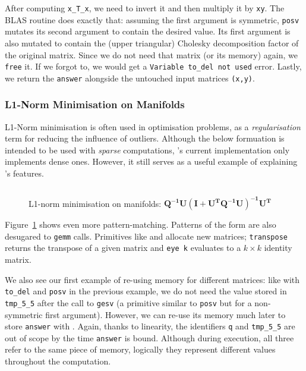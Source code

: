 After computing \texttt{x\_T\_x}, we need to invert it and then multiply it by
\texttt{xy}. The BLAS routine 
does exactly that: assuming the first argument is symmetric, \texttt{posv}
mutates its second argument to contain the desired value. Its first argument is
also mutated to contain the (upper triangular) Cholesky decomposition factor of
the original matrix. Since we do not need that matrix (or its memory) again, we
\texttt{free} it. If we forgot to, we would get a \texttt{Variable to\_del not
used} error. Lastly, we return the \texttt{answer} alongside the untouched
input matrices \texttt{(x,y)}.

\subsubsection{L1-Norm Minimisation on Manifolds}

L1-Norm minimisation is often used in optimisation problems, as a
\emph{regularisation} term for reducing the influence of outliers.  Although
the below formuation\cite{bronstein} is intended to be used with \emph{sparse}
computations, \lang's current implementation only implements dense ones.
However, it still serves as a useful example of explaining \lang's features.

\begin{figure}[t]
    \centering
    \inputminted[fontsize=\small]{ocaml}{../../examples/l1_norm_min.lt}
    \caption{L1-norm minimisation on manifolds:
        $\mathbf{Q^{-1}U(I+U^TQ^{-1}U)^{-1}U^T}$}\label{fig:lang_l1_norm_min}
\end{figure}

Figure~\ref{fig:lang_l1_norm_min} shows even more pattern-matching. Patterns of
the form  are also desugared to
\texttt{gemm} calls. Primitives like  and  allocate new matrices;
\texttt{transpose} returns the transpose of a given matrix and \texttt{eye k}
evaluates to a $k \times k$ identity matrix.

We also see our first example of re-using memory for different matrices: like
with \texttt{to\_del} and \texttt{posv} in the previous example, we do not need
the value stored in \texttt{tmp\_5\_5} after the call to \texttt{gesv} (a
primitive similar to \texttt{posv} but for a non-symmetric first argument).
However, we can re-use its memory much later to store \texttt{answer} with
. Again, thanks to
linearity, the identifiers \texttt{q} and \texttt{tmp\_5\_5} are out of scope
by the time \texttt{answer} is bound. Although during execution, all three
refer to the same piece of memory, logically they represent different values
throughout the computation.

